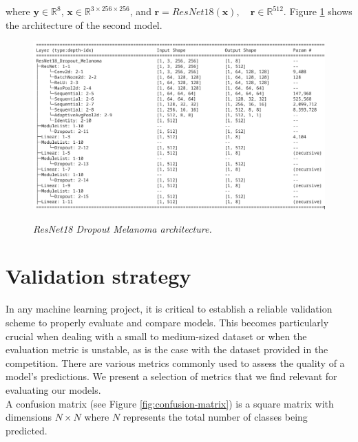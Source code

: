 where \( \mathbf{y} \in  \mathbb{R}^8 \), \( \mathbf{x}  \in \mathbb{R}^{3
\times 256 \times 256} \),  and \(\mathbf{r} = ResNet18(\mathbf{x}), \quad
\mathbf{r} \in \mathbb{R}^{512}\). Figure
\ref{fig:resnet-18-dropout-melanoma-arch} shows the architecture of the second
model.

\begin{figure}[H]
  \centering
  \includegraphics[width=\textwidth]{imatges/methodological_contribution/ResNet18_Dropout_Melanoma.png}
  \caption[ResNet18\_Dropout\_Melanoma architecture]{\textit{ResNet18 Dropout Melanoma architecture.}}
  {\label{fig:resnet-18-dropout-melanoma-arch}}
\end{figure}


\section{Validation strategy}

In any machine learning project, it is critical to establish a reliable
validation scheme to properly evaluate and compare models. This becomes
particularly crucial when dealing with a small to medium-sized dataset or when
the evaluation metric is unstable, as is the case with the dataset provided in
the competition. There are various metrics commonly used to assess the quality of a model's
predictions. We present a selection of metrics that we find relevant for
evaluating our models. \\

A confusion matrix (see Figure \ref{fig:confusion-matrix}) is a square matrix
with dimensions \(N\times N\) where \(N\) represents the total number of classes being
predicted.

